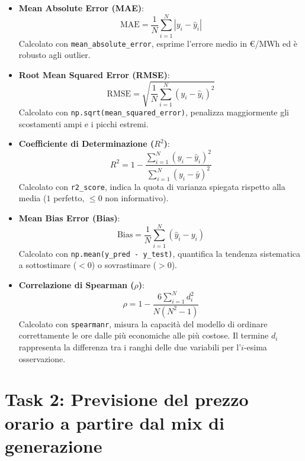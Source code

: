 \begin{itemize}
    \item \textbf{Mean Absolute Error (MAE)}:
    \begin{equation}
    \text{MAE} = \frac{1}{N} \sum_{i=1}^{N} |y_i - \hat{y}_i|
    \end{equation}
    Calcolato con \texttt{mean\_absolute\_error}, esprime l'errore medio in \euro/MWh ed è robusto agli outlier.

    \item \textbf{Root Mean Squared Error (RMSE)}:
    \begin{equation}
    \text{RMSE} = \sqrt{\frac{1}{N} \sum_{i=1}^{N} (y_i - \hat{y}_i)^2}
    \end{equation}
    Calcolato con \texttt{np.sqrt(mean\_squared\_error)}, penalizza maggiormente gli scostamenti ampi e i picchi estremi.

    \item \textbf{Coefficiente di Determinazione ($R^2$)}:
    \begin{equation}
    R^2 = 1 - \frac{\sum_{i=1}^N (y_i - \hat{y}_i)^2}{\sum_{i=1}^N (y_i - \bar{y})^2}
    \end{equation}
    Calcolato con \texttt{r2\_score}, indica la quota di varianza spiegata rispetto alla media ($1$ perfetto, $\leq 0$ non informativo).

    \item \textbf{Mean Bias Error (Bias)}:
    \begin{equation}
    \text{Bias} = \frac{1}{N} \sum_{i=1}^{N} (\hat{y}_i - y_i)
    \end{equation}
    Calcolato con \texttt{np.mean(y\_pred - y\_test)}, quantifica la tendenza sistematica a sottostimare ($<0$) o sovrastimare ($>0$).

    \item \textbf{Correlazione di Spearman ($\rho$)}:
    \begin{equation}
    \rho = 1 - \frac{6 \sum_{i=1}^{N} d_i^2}{N(N^2 - 1)}
    \end{equation}
    Calcolato con \texttt{spearmanr}, misura la capacità del modello di ordinare correttamente le ore dalle più economiche alle più costose. Il termine $d_i$ rappresenta la differenza tra i ranghi delle due variabili per l'$i$-esima osservazione.
\end{itemize}

\section{Task 2: Previsione del prezzo orario a partire dal mix di generazione}
\label{sec:t2_regressione_obiettivo}

